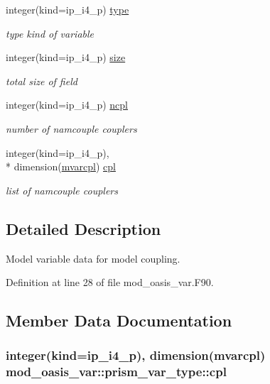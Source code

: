 \begin{DoxyCompactItemize}
integer(kind=ip\+\_\+i4\+\_\+p) \hyperlink{structmod__oasis__var_1_1prism__var__type_a944549d5fb1aebecc59ca5dbff9b3222}{type}
\begin{DoxyCompactList}\small\item\em type kind of variable \end{DoxyCompactList}\item 
integer(kind=ip\+\_\+i4\+\_\+p) \hyperlink{structmod__oasis__var_1_1prism__var__type_a13dac48e592591a9e06999aadaf1e6b7}{size}
\begin{DoxyCompactList}\small\item\em total size of field \end{DoxyCompactList}\item 
integer(kind=ip\+\_\+i4\+\_\+p) \hyperlink{structmod__oasis__var_1_1prism__var__type_a5e74e0f54df6c10c13569250bd616c94}{ncpl}
\begin{DoxyCompactList}\small\item\em number of namcouple couplers \end{DoxyCompactList}\item 
integer(kind=ip\+\_\+i4\+\_\+p), \\*
dimension(\hyperlink{classmod__oasis__var_a687d6dce16699f36ae3a67accfdba3a9}{mvarcpl}) \hyperlink{structmod__oasis__var_1_1prism__var__type_aca0fbd288bee74de5e08e77ad869039b}{cpl}
\begin{DoxyCompactList}\small\item\em list of namcouple couplers \end{DoxyCompactList}\end{DoxyCompactItemize}


\subsection{Detailed Description}
Model variable data for model coupling. 

Definition at line 28 of file mod\+\_\+oasis\+\_\+var.\+F90.



\subsection{Member Data Documentation}
\hypertarget{structmod__oasis__var_1_1prism__var__type_aca0fbd288bee74de5e08e77ad869039b}{
\subsubsection[{cpl}]{\setlength{\rightskip}{0pt plus 5cm}integer(kind=ip\+\_\+i4\+\_\+p), dimension({\bf mvarcpl}) mod\+\_\+oasis\+\_\+var\+::prism\+\_\+var\+\_\+type\+::cpl\hspace{0.3cm}{\ttfamily [private]}}}\label{structmod__oasis__var_1_1prism__var__type_aca0fbd288bee74de5e08e77ad869039b}



